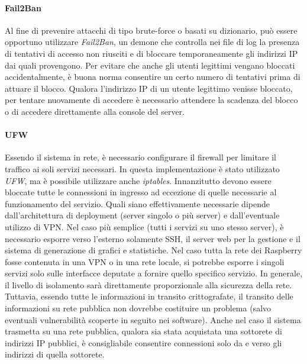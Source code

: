 \paragraph{Fail2Ban}
Al fine di prevenire attacchi di tipo brute-force o basati su dizionario, può essere opportuno utilizzare \textit{Fail2Ban}, un demone che controlla nei file di log la presenza di tentativi di accesso non riusciti e di bloccare temporaneamente gli indirizzi IP dai quali provengono.
Per evitare che anche gli utenti legittimi vengano bloccati accidentalmente, è buona norma consentire un certo numero di tentativi prima di attuare il blocco.
Qualora l'indirizzo IP di un utente legittimo venisse bloccato, per tentare nuovamente di accedere è necessario attendere la scadenza del blocco o di accedere direttamente alla console del server.
\paragraph{UFW}
Essendo il sistema in rete, è necessario configurare il firewall per limitare il traffico ai soli servizi necessari. In questa implementazione è stato utilizzato \textit{UFW}, ma è possibile utilizzare anche \textit{iptables}.
Innanzitutto devono essere bloccate tutte le connessioni in ingresso ad eccezione di quelle necessarie al funzionamento del servizio. Quali siano effettivamente necessarie dipende dall'architettura di deployment (server singolo o più server) e dall'eventuale utilizzo di VPN.
Nel caso più semplice (tutti i servizi su uno stesso server), è necessario esporre verso l'esterno solamente SSH, il server web per la gestione e il sistema di generazione di grafici e statistiche.
Nel caso tutta la rete dei Raspberry fosse contenuta in una VPN o in una rete locale, si potrebbe esporre i singoli servizi solo sulle interfacce deputate a fornire quello specifico servizio.
In generale, il livello di isolamento sarà direttamente proporzionale alla sicurezza della rete.
Tuttavia, essendo tutte le informazioni in transito crittografate, il transito delle informazioni su rete pubblica non dovrebbe costituire un problema (salvo eventuali vulnerabilità scoperte in seguito nei software).
Anche nel caso il sistema trasmetta su una rete pubblica, qualora sia stata acquistata una sottorete di indirizzi IP pubblici, è consigliabile consentire connessioni solo da e verso gli indirizzi di quella sottorete.

